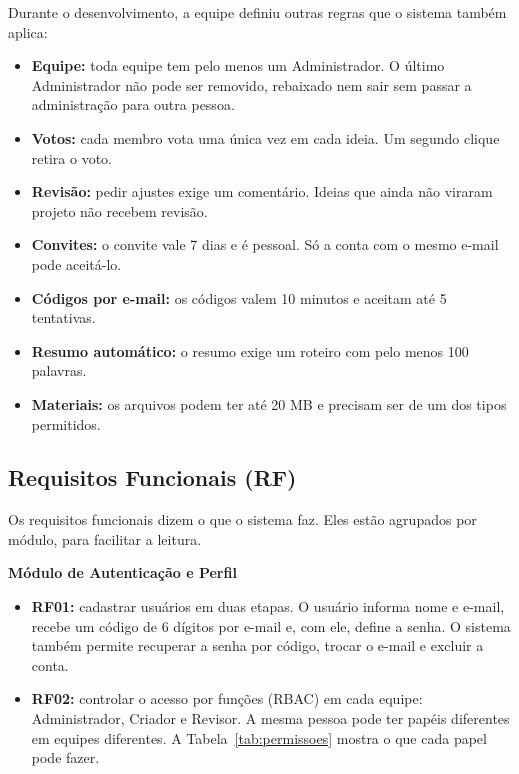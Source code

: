 Durante o desenvolvimento, a equipe definiu outras regras que o sistema também aplica:

\begin{itemize}
    \item \textbf{Equipe:} toda equipe tem pelo menos um Administrador. O último Administrador não pode ser removido, rebaixado nem sair sem passar a administração para outra pessoa.
    \item \textbf{Votos:} cada membro vota uma única vez em cada ideia. Um segundo clique retira o voto.
    \item \textbf{Revisão:} pedir ajustes exige um comentário. Ideias que ainda não viraram projeto não recebem revisão.
    \item \textbf{Convites:} o convite vale 7 dias e é pessoal. Só a conta com o mesmo e-mail pode aceitá-lo.
    \item \textbf{Códigos por e-mail:} os códigos valem 10 minutos e aceitam até 5 tentativas.
    \item \textbf{Resumo automático:} o resumo exige um roteiro com pelo menos 100 palavras.
    \item \textbf{Materiais:} os arquivos podem ter até 20 MB e precisam ser de um dos tipos permitidos.
\end{itemize}

\subsection{Requisitos Funcionais (RF)}

Os requisitos funcionais dizem o que o sistema faz. Eles estão agrupados por módulo, para facilitar a leitura.

\textbf{Módulo de Autenticação e Perfil}

\begin{itemize}
    \item \textbf{RF01:} cadastrar usuários em duas etapas. O usuário informa nome e e-mail, recebe um código de 6 dígitos por e-mail e, com ele, define a senha. O sistema também permite recuperar a senha por código, trocar o e-mail e excluir a conta.
    \item \textbf{RF02:} controlar o acesso por funções (RBAC) em cada equipe: Administrador, Criador e Revisor. A mesma pessoa pode ter papéis diferentes em equipes diferentes. A Tabela~\ref{tab:permissoes} mostra o que cada papel pode fazer.
\end{itemize}

